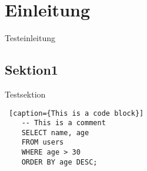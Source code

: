 \chapter{Einleitung}
Testeinleitung

\section{Sektion1}
Testsektion \cite{Nuijten2023}

\begin{lstlisting} [caption={This is a code block}]
    -- This is a comment
    SELECT name, age
    FROM users
    WHERE age > 30
    ORDER BY age DESC;
    \end{lstlisting}